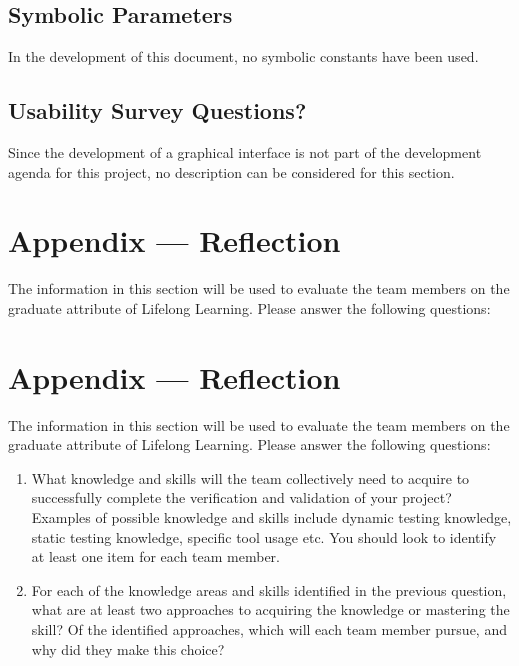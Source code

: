 \documentclass[12pt, titlepage]{article}
\begin{document}
\subsection{Symbolic Parameters}

In the development of this document, no symbolic constants have been used.
\subsection{Usability Survey Questions?}

Since the development of a graphical interface is not part of the development agenda for this project, no description can be considered for this section.

\newpage{}
\section*{Appendix --- Reflection}

The information in this section will be used to evaluate the team members on the
graduate attribute of Lifelong Learning.  Please answer the following questions:

\newpage{}
\section*{Appendix --- Reflection}


The information in this section will be used to evaluate the team members on the
graduate attribute of Lifelong Learning.  Please answer the following questions:

\begin{enumerate}
  \item What knowledge and skills will the team collectively need to acquire to
  successfully complete the verification and validation of your project?
  Examples of possible knowledge and skills include dynamic testing knowledge,
  static testing knowledge, specific tool usage etc.  You should look to
  identify at least one item for each team member.
  \item For each of the knowledge areas and skills identified in the previous
  question, what are at least two approaches to acquiring the knowledge or
  mastering the skill?  Of the identified approaches, which will each team
  member pursue, and why did they make this choice?
\end{enumerate}
\end{document}
